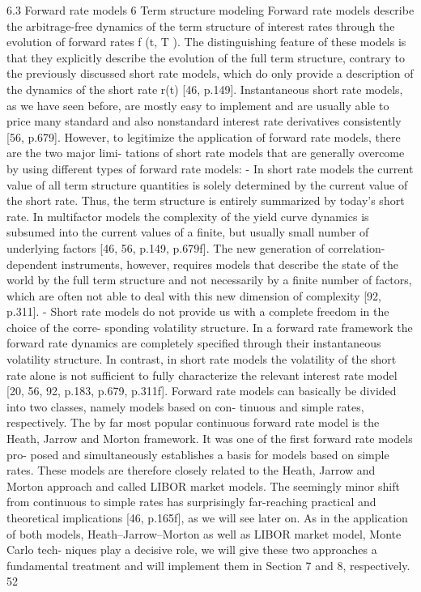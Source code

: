 6.3 Forward rate models
6 Term structure modeling
Forward rate models describe the arbitrage-free dynamics of the term structure of interest rates through the evolution of forward rates f (t, T ). The distinguishing feature of these models is that they explicitly describe the evolution of the full term structure, contrary to the previously discussed short rate models, which do only provide a description of the dynamics of the short rate r(t) [46, p.149]. Instantaneous short rate models, as we have seen before, are mostly easy to implement and are usually able to price many standard and also nonstandard interest rate derivatives consistently [56, p.679].
However, to legitimize the application of forward rate models, there are the two major limi- tations of short rate models that are generally overcome by using different types of forward rate models:
- In short rate models the current value of all term structure quantities is solely determined by the current value of the short rate. Thus, the term structure is entirely summarized by today’s short rate. In multifactor models the complexity of the yield curve dynamics is subsumed into the current values of a finite, but usually small number of underlying factors [46, 56, p.149, p.679f]. The new generation of correlation-dependent instruments, however, requires models that describe the state of the world by the full term structure and not necessarily by a finite number of factors, which are often not able to deal with this new dimension of complexity [92, p.311].
- Short rate models do not provide us with a complete freedom in the choice of the corre- sponding volatility structure. In a forward rate framework the forward rate dynamics are completely specified through their instantaneous volatility structure. In contrast, in short rate models the volatility of the short rate alone is not sufficient to fully characterize the relevant interest rate model [20, 56, 92, p.183, p.679, p.311f].
Forward rate models can basically be divided into two classes, namely models based on con- tinuous and simple rates, respectively. The by far most popular continuous forward rate model is the Heath, Jarrow and Morton framework. It was one of the first forward rate models pro- posed and simultaneously establishes a basis for models based on simple rates. These models are therefore closely related to the Heath, Jarrow and Morton approach and called LIBOR market models. The seemingly minor shift from continuous to simple rates has surprisingly far-reaching practical and theoretical implications [46, p.165f], as we will see later on. As in the application of both models, Heath–Jarrow–Morton as well as LIBOR market model, Monte Carlo tech- niques play a decisive role, we will give these two approaches a fundamental treatment and will implement them in Section 7 and 8, respectively.
52

